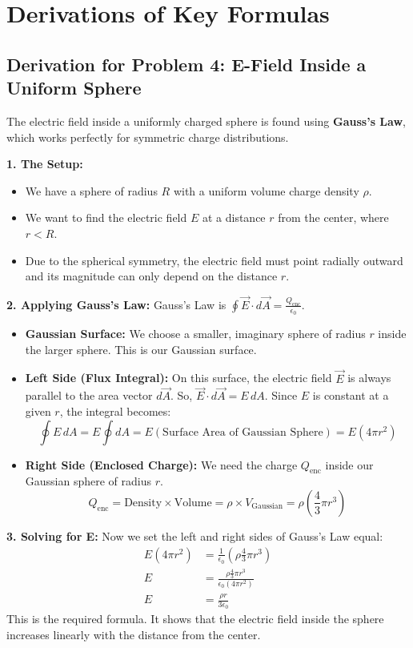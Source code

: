 \documentclass{article}
\numberwithin{equation}{section}
\begin{document}
\newpage
\section{Derivations of Key Formulas}

\subsection{Derivation for Problem 4: E-Field Inside a Uniform Sphere}
The electric field inside a uniformly charged sphere is found using \textbf{Gauss's Law}, which works perfectly for symmetric charge distributions.

\textbf{1. The Setup:}
\begin{itemize}
    \item We have a sphere of radius $R$ with a uniform volume charge density $\rho$.
    \item We want to find the electric field $E$ at a distance $r$ from the center, where $r < R$.
    \item Due to the spherical symmetry, the electric field must point radially outward and its magnitude can only depend on the distance $r$.
\end{itemize}

\textbf{2. Applying Gauss's Law:}
Gauss's Law is $\oint \vec{E} \cdot d\vec{A} = \frac{Q_{\text{enc}}}{\epsilon_0}$.
\begin{itemize}
    \item \textbf{Gaussian Surface:} We choose a smaller, imaginary sphere of radius $r$ inside the larger sphere. This is our Gaussian surface.
    \item \textbf{Left Side (Flux Integral):} On this surface, the electric field $\vec{E}$ is always parallel to the area vector $d\vec{A}$. So, $\vec{E} \cdot d\vec{A} = E \, dA$. Since $E$ is constant at a given $r$, the integral becomes:
    $$ \oint E \, dA = E \oint dA = E (\text{Surface Area of Gaussian Sphere}) = E (4\pi r^2) $$
    \item \textbf{Right Side (Enclosed Charge):} We need the charge $Q_{\text{enc}}$ inside our Gaussian sphere of radius $r$.
    $$ Q_{\text{enc}} = \text{Density} \times \text{Volume} = \rho \times V_{\text{Gaussian}} = \rho \left( \frac{4}{3}\pi r^3 \right) $$
\end{itemize}

\textbf{3. Solving for E:}
Now we set the left and right sides of Gauss's Law equal:
\begin{align*}
    E (4\pi r^2) &= \frac{1}{\epsilon_0} \left( \rho \frac{4}{3}\pi r^3 \right) \\
    E &= \frac{\rho \frac{4}{3}\pi r^3}{\epsilon_0 (4\pi r^2)} \\
    E &= \frac{\rho r}{3\epsilon_0}
\end{align*}
This is the required formula. It shows that the electric field inside the sphere increases linearly with the distance from the center.
\end{document}

